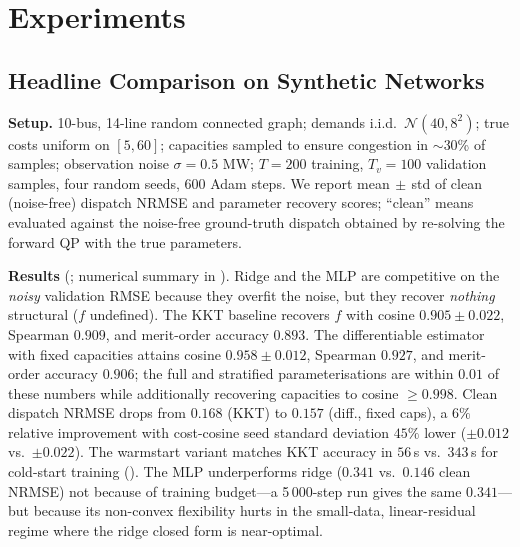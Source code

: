 \documentclass[conference]{IEEEtran}
\begin{document}
\section{Experiments}
\label{sec:exp}

\subsection{Headline Comparison on Synthetic Networks}
\label{sec:exp_main}
\textbf{Setup.} 10-bus, 14-line random connected graph; demands i.i.d.\
$\mathcal{N}(40,8^2)$; true costs uniform on $[5,60]$; capacities sampled
to ensure congestion in $\sim$30\% of samples; observation noise
$\sigma=0.5$ MW; $T=200$ training, $T_v=100$ validation samples, four random
seeds, 600 Adam steps. We report mean$\,\pm\,$std of clean (noise-free)
dispatch NRMSE and parameter recovery scores; ``clean'' means evaluated
against the noise-free ground-truth dispatch obtained by re-solving the
forward QP with the true parameters.

\textbf{Results} (;
numerical summary in \Cref{tab:methods}). Ridge and the MLP are competitive
on the \emph{noisy} validation RMSE because they overfit the noise, but they
recover \emph{nothing} structural ($f$ undefined). The KKT baseline
recovers $f$ with cosine $0.905\pm0.022$, Spearman $0.909$, and
merit-order accuracy $0.893$. The differentiable estimator with fixed
capacities attains cosine $\mathbf{0.958\pm0.012}$, Spearman $0.927$, and
merit-order accuracy $\mathbf{0.906}$; the full and stratified
parameterisations are within $0.01$ of these numbers while additionally
recovering capacities to cosine $\ge0.998$. Clean dispatch NRMSE
drops from $0.168$ (KKT) to $\mathbf{0.157}$ (diff., fixed caps), a
$6\%$ relative improvement with cost-cosine seed standard deviation $45\%$
lower ($\pm0.012$ vs.\ $\pm0.022$).
The warmstart variant matches KKT accuracy in $56\,$s vs.\ $343\,$s
for cold-start training (\Cref{sec:exp_warmstart}).
The MLP underperforms ridge ($0.341$ vs.\ $0.146$ clean NRMSE) not because of
training budget---a 5\,000-step run gives the same $0.341$---but because
its non-convex flexibility hurts in the small-data, linear-residual regime
where the ridge closed form is near-optimal.
\end{document}
